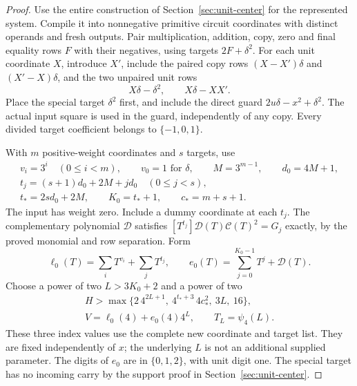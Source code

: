 \begin{proof}
Use the entire construction of Section~\ref{sec:unit-center} for
the represented system. Compile it into nonnegative primitive
circuit coordinates with distinct operands and fresh outputs.
Pair multiplication, addition, copy, zero and final equality rows
$F$ with their negatives, using targets $2F+\delta^2$. For each
unit coordinate $X$, introduce $X'$, include the paired copy rows
$(X-X')\delta$ and $(X'-X)\delta$, and the two unpaired unit rows
\[
 X\delta-\delta^2,\qquad X\delta-XX'.
\]
Place the special target $\delta^2$ first, and include the direct
guard $2u\delta-x^2+\delta^2$. The actual input square is used in
the guard, independently of any copy. Every divided target
coefficient belongs to $\{-1,0,1\}$.

With $m$ positive-weight coordinates and $s$ targets, use
\[
\begin{gathered}
 v_i=3^i\quad(0\le i<m),\qquad v_0=1\text{ for }\delta,
 \qquad M=3^{m-1},\qquad d_0=4M+1,\\
 t_j=(s+1)d_0+2M+jd_0\quad(0\le j<s),\\
 t_*=2sd_0+2M,\qquad K_0=t_*+1,\qquad c_*=m+s+1.
\end{gathered}
\]
The input has weight zero. Include a dummy coordinate at each $t_j$.
The complementary polynomial $\mathcal D$ satisfies
$[T^{t_j}]\mathcal D(T)\mathcal C(T)^2=G_j$ exactly, by the proved
monomial and row separation. Form
\[
 \ell_0(T)=\sum_iT^{v_i}+\sum_jT^{t_j},\qquad
 e_0(T)=\sum_{j=0}^{K_0-1}T^j+\mathcal D(T).
\]
Choose a power of two $L>3K_0+2$ and a power of two
\begin{equation}\label{eq:composed97-index}
 \begin{gathered}
 H>\max\{2\,4^{2L+1},\ 4^{t_*+3}\,4c_*^2,\ 3L,\ 16\},\\
 V=\ell_0(4)+e_0(4)4^L,
 \qquad T_L=\psi_4(L).
 \end{gathered}
\end{equation}
These three index values use the complete new coordinate and target
list. They are fixed independently of $x$; the underlying $L$ is
not an additional supplied parameter. The digits of $e_0$ are in
$\{0,1,2\}$, with unit digit one. The special target has no incoming
carry by the support proof in Section~\ref{sec:unit-center}.


\end{proof}
